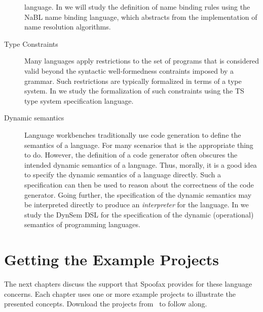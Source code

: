 \begin{description}
language. In  we will study the definition of name binding rules
using the NaBL name binding language, which abstracts from the implementation of
name resolution algorithms.
\item[Type Constraints] Many languages apply restrictions to the set of programs
that is considered valid beyond the syntactic well-formedness contraints imposed
by a grammar. Such restrictions are typically formalized in terms of a type
system. In  we study the formalization of such constraints using
the TS type system specification language. 
\item[Dynamic semantics] Language workbenches traditionally use code generation
to define the semantics of a language. For many scenarios that is the
appropriate thing to do. However, the definition of a code generator often
obscures the intended dynamic semantics of a language. Thus, morally, it is a
good idea to specify the dynamic semantics of a language directly. Such a
specification can then be used to reason about the correctness of the code
generator. Going further, the specification of the dynamic semantics may be
interpreted directly to produce an \emph{interpreter} for the language. In
 we study the DynSem DSL for the specification of the dynamic
(operational) semantics of programming languages.
\end{description}

\section{Getting the Example Projects}

The next chapters discuss the support that Spoofax provides for these
language concerns. Each chapter uses one or more example projects to illustrate
the presented concepts. Download the projects from \LanguagesRepoRef\ to follow along.
